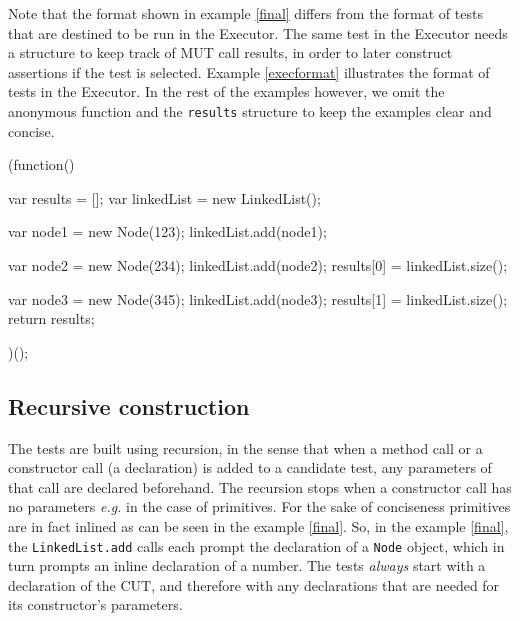 Note that the format shown in example \ref{final} differs from the format of tests that are destined to be run in the \textsf{Executor}. The same test in the \textsf{Executor} needs a structure to keep track of MUT call results, in order to later construct assertions if the test is selected. Example \ref{execformat} illustrates the format of tests in the \textsf{Executor}. In the rest of the examples however, we omit the anonymous function and the \texttt{results} structure to keep the examples clear and concise.

% 
% 
\begin{code}[caption=\textsf{Executor} format,label=execformat]
(function() {
   var results = [];
   var linkedList = new LinkedList();

   var node1 = new Node(123);
   linkedList.add(node1);

   var node2 = new Node(234);
   linkedList.add(node2);
   results[0] = linkedList.size();

   var node3 = new Node(345);
   linkedList.add(node3);
   results[1] = linkedList.size();
   return results;
})();
\end{code}

\subsection{Recursive construction}

The tests are built using recursion, in the sense that when a method call or a constructor call (a declaration) is added to a candidate test, any parameters of that call are declared beforehand. The recursion stops when a constructor call has no parameters \emph{e.g.} in the case of primitives. For the sake of conciseness primitives are in fact inlined as can be seen in the example \ref{final}. So, in the example \ref{final}, the \texttt{LinkedList.add} calls each prompt the declaration of a \texttt{Node} object, which in turn prompts an inline declaration of a number.
The tests \emph{always} start with a declaration of the CUT, and therefore with any declarations that are needed for its constructor's parameters.

